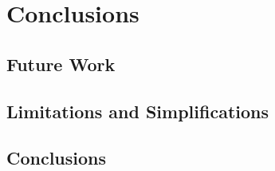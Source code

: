 \chapter{Conclusions}
\label{cha:789}

\section{Future Work}
\section{Limitations and Simplifications}
\section{Conclusions}